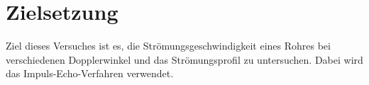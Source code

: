 \section{Zielsetzung}
Ziel dieses Versuches ist es, die Strömungsgeschwindigkeit eines Rohres bei 
verschiedenen Dopplerwinkel und das Strömungsprofil zu untersuchen.
Dabei wird das Impuls-Echo-Verfahren verwendet.